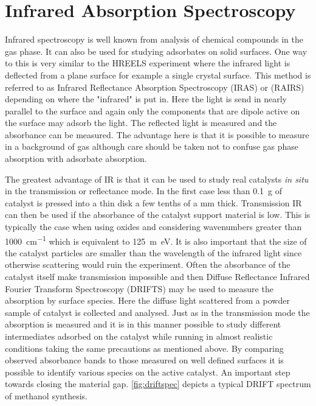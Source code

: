 \section{Infrared Absorption Spectroscopy}
Infrared spectroscopy is well known from analysis of chemical compounds in the gas phase. It can also be used for studying adsorbates on solid surfaces. One way to this is very similar to the HREELS experiment where the infrared light is deflected from a plane surface for example a single crystal surface.  This method is referred to as Infrared Reflectance Absorption Spectroscopy (IRAS) or (RAIRS) depending on where the "infrared" is put in. Here the light is send in nearly parallel to the surface and again only the components that are dipole active on the surface may adsorb the light. The reflected light is measured and the absorbance can be measured. The advantage here is that it is possible to measure in a background of gas although care should be taken not to confuse gas phase absorption  with adsorbate absorption. 

The greatest advantage of IR is that it can be used to study real catalysts {\it in situ} in the transmission or reflectance mode. In the first case less than \SI{0.1}{g} of catalyst is  pressed into a thin disk a few tenths of a \si{mm} thick. Transmission IR can then be used if the absorbance of the catalyst support material is low. This is typically the case when using oxides and considering wavenumbers greater than \SI{1000}{cm^{-1}} which is equivalent to \SI{125}{m\electronvolt}. It is also important that the size of the catalyst particles are smaller than the wavelength of the infrared light since otherwise scattering would ruin the experiment. Often the absorbance of the catalyst itself make transmission impossible and then Diffuse Reflectance Infrared  Fourier Transform Spectroscopy (DRIFTS) may be used to measure the absorption by surface species. Here the diffuse light scattered from a powder sample of catalyst is collected and analysed. Just as in the transmission mode the absorption is measured and it is in this manner possible to study different intermediates adsorbed on the catalyst while running in almost realistic conditions taking the same precautions as mentioned above. By comparing observed absorbance bands to those measured on well defined surfaces it is possible to identify various species on the active catalyst. An important step towards closing the material gap. \autoref{fig:driftspec} depicts a typical DRIFT spectrum of  methanol synthesis.

